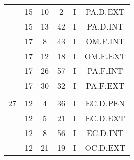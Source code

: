 \documentclass[12pt, a4paper]{article}
\begin{document}
\begin{multicols}{3}
{\begin{tabular}{c c c c c c}
	 	 	 	 & 15 & 10 & 2 & I & PA.D.EXT\\%
	 	 	 	 & 15 & 13 & 42 & I & PA.D.INT\\%
	 	 	 	 & 17 & 8 & 43 & I & OM.F.INT\\%
	 	 	 	 & 17 & 12 & 18 & I & OM.F.EXT\\%
	 	 	 	 & 17 & 26 & 57 & I & PA.F.INT\\%
	 	 	 	 & 17 & 30 & 32 & I & PA.F.EXT\\%
	 	 	 	 & & & & & \\%
	 	 	 	27 & 12 & 4 & 36 & I & EC.D.PEN\\%
	 	 	 	 & 12 & 5 & 21 & I & EC.D.EXT\\%
	 	 	 	 & 12 & 8 & 56 & I & EC.D.INT\\%
	 	 	 	 & 12 & 21 & 19 & I & OC.D.EXT\\%
	 	 \end{tabular}
 	}
\end{multicols}
\end{document}
